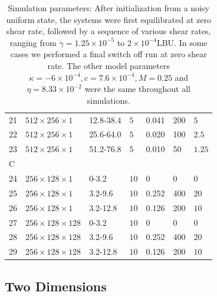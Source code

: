 \documentclass[8.5pt,twoside,twocolumn]{article}
\begin{document}
\begin{table}[htp]
\begin{tabular*}{0.52\textwidth}{l|l|l|l|l|l|l}
21 & $512\times256\times1$ & 12.8-38.4& $5$ &0.041 & 200 &  $5$ \\
22 & $512\times256\times1$ & 25.6-64.0& $5$ &0.020 & 100 &  $2.5$ \\
23 & $512\times256\times1$ & 51.2-76.8& $5$ &0.010 & 50 &  $1.25$ \\
\hline
C & & & & & &\\
\hline
24 & $256\times128\times1$ & 0-3.2& $10$ &0 & 0 & 0 \\
25 & $256\times128\times1$ & 3.2-9.6& $10$ &0.252 & 400 &  $20$ \\
26 & $256\times128\times1$ & 3.2-12.8& $10$ &0.126 & 200 &  $10$ \\
\hline
27 & $256\times128\times128$ & 0-3.2 & $10$ &0 & 0 &  0 \\
28 & $256\times128\times128$ & 3.2-9.6 & $10$ &0.252 & 400 &  $20$\\
29 & $256\times128\times128$ & 3.2-12.8 & $10$ &0.126 & 200 &  $10$\\
\hline
\end{tabular*}

\caption{Simulation parameters: After initialization from a noisy uniform state, the systems were first equilibrated at zero shear rate, followed by a sequence of various shear rates, ranging from $\dot{\gamma}=1.25\times10^{-5}$ to $2\times10^{-4}$LBU. In some cases we performed a final switch off run at zero shear rate. The other model parameters $\kappa=-6\times10^{-4}, c=7.6\times10^{-4}, M=0.25$ and $\eta=8.33\times10^{-2}$ were the same throughout all simulations.}
\label{tab1}
\end{table}

\subsection{Two Dimensions}
\end{document}
